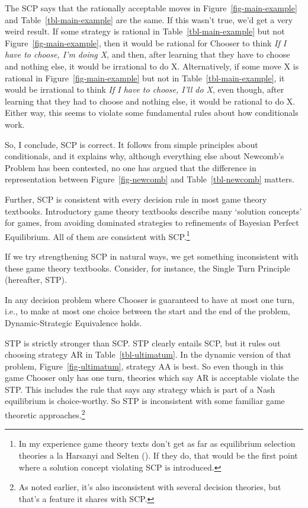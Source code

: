 \documentclass[
  11pt,
  letterpaper,
  DIV=11,
  numbers=noendperiod,
  twoside]{scrartcl}
\providecommand{\tightlist}{%
  \setlength{\itemsep}{0pt}\setlength{\parskip}{0pt}}
\begin{document}
The SCP says that the rationally acceptable moves in
Figure~\ref{fig-main-example} and Table~\ref{tbl-main-example} are the
same. If this wasn't true, we'd get a very weird result. If some
strategy is rational in Table~\ref{tbl-main-example} but not
Figure~\ref{fig-main-example}, then it would be rational for Chooser to
think \emph{If I have to choose, I'm doing X}, and then, after learning
that they have to choose and nothing else, it would be irrational to do
X. Alternatively, if some move X is rational in
Figure~\ref{fig-main-example} but not in Table~\ref{tbl-main-example},
it would be irrational to think \emph{If I have to choose, I'll do X},
even though, after learning that they had to choose and nothing else, it
would be rational to do X. Either way, this seems to violate some
fundamental rules about how conditionals work.

So, I conclude, SCP is correct. It follows from simple principles about
conditionals, and it explains why, although everything else about
Newcomb's Problem has been contested, no one has argued that the
difference in representation between Figure~\ref{fig-newcomb} and
Table~\ref{tbl-newcomb} matters.

Further, SCP is consistent with every decision rule in most game theory
textbooks. Introductory game theory textbooks describe many `solution
concepts' for games, from avoiding dominated strategies to refinements
of Bayesian Perfect Equilibrium. All of them are consistent with
SCP.\footnote{In my experience game theory texts don't get as far as
  equilibrium selection theories a la Harsanyi and Selten
  (). If they do, that would be
  the first point where a solution concept violating SCP is introduced.}

If we try strengthening SCP in natural ways, we get something
inconsistent with these game theory textbooks. Consider, for instance,
the Single Turn Principle (hereafter, STP).

\begin{description}
\tightlist
\item[Single Turn Principle]
In any decision problem where Chooser is guaranteed to have at most one
turn, i.e., to make at most one choice between the start and the end of
the problem, Dynamic-Strategic Equivalence holds.
\end{description}

STP is strictly stronger than SCP. STP clearly entails SCP, but it rules
out choosing strategy AR in Table~\ref{tbl-ultimatum}. In the dynamic
version of that problem, Figure~\ref{fig-ultimatum}, strategy AA is
best. So even though in this game Chooser only has one turn, theories
which say AR is acceptable violate the STP. This includes the rule that
says any strategy which is part of a Nash equilibrium is choice-worthy.
So STP is inconsistent with some familiar game theoretic
approaches.\footnote{As noted earlier, it's also inconsistent with
  several decision theories, but that's a feature it shares with SCP.}
\end{document}
